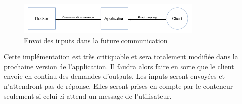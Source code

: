 \begin{figure}[H]
\centering
\includegraphics[width=0.8\textwidth]{./img/communication/envoiinput.png}
\caption{Envoi des inputs dans la future communication}
\end{figure}

\par Cette implémentation est très critiquable et sera totalement modifiée dans la prochaine version de l'application. Il faudra alors faire en sorte que le client envoie en continu des demandes d'outputs. Les inputs seront envoyées et n'attendront pas de réponse. Elles seront prises en compte par le conteneur seulement si celui-ci attend un message de l'utilisateur.